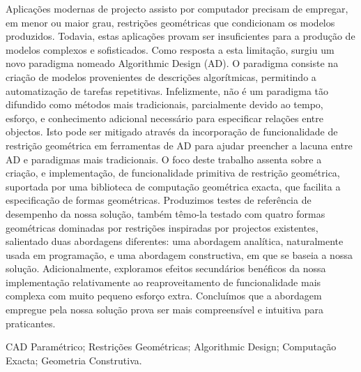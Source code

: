 \begin{pt}
\begin{resumo}

Aplicações modernas de projecto assisto por computador precisam de empregar, em
menor ou maior grau, restrições geométricas que condicionam os modelos
produzidos.  Todavia, estas aplicações provam ser insuficientes para a produção
de modelos complexos e sofisticados.  Como resposta a esta limitação, surgiu um
novo paradigma nomeado Algorithmic Design (AD).  O paradigma consiste na criação
de modelos provenientes de descrições algorítmicas, permitindo a automatização
de tarefas repetitivas.  Infelizmente, não é um paradigma tão difundido como
métodos mais tradicionais, parcialmente devido ao tempo, esforço, e conhecimento
adicional necessário para especificar relações entre objectos.  Isto pode ser
mitigado através da incorporação de funcionalidade de restrição geométrica em
ferramentas de AD para ajudar preencher a lacuna entre AD e paradigmas mais
tradicionais.  O foco deste trabalho assenta sobre a criação, e implementação,
de funcionalidade primitiva de restrição geométrica, suportada por uma
biblioteca de computação geométrica exacta, que facilita a especificação de
formas geométricas.  Produzimos testes de referência de desempenho da nossa
solução, também têmo-la testado com quatro formas geométricas dominadas por
restrições inspiradas por projectos existentes, salientado duas abordagens
diferentes: uma abordagem analítica, naturalmente usada em programação, e uma
abordagem constructiva, em que se baseia a nossa solução.  Adicionalmente,
exploramos efeitos secundários benéficos da nossa implementação relativamente ao
reaproveitamento de funcionalidade mais complexa com muito pequeno esforço
extra.  Concluímos que a abordagem empregue pela nossa solução prova ser mais
compreensível e intuitiva para praticantes.

\end{resumo}

\begin{palavraschave}
\noindent
CAD Paramétrico;
Restrições Geométricas;
Algorithmic Design;
Computação Exacta;
Geometria Construtiva.
\end{palavraschave}
\end{pt}

\clearpage
\thispagestyle{empty}
